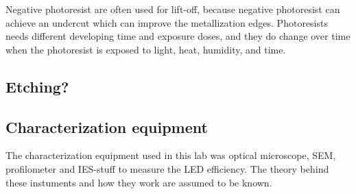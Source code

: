 Negative photoresist are often used for lift-off, because negative photoresist can achieve an undercut which can improve the metallization edges.
Photoresists needs different developing time and exposure doses, and they do change over time when the photoresist is exposed to light, heat, humidity, and time.



\subsection{Etching?}
\label{etching}


\subsection{Characterization equipment}
\label{characterization}

The characterization equipment used in this lab was optical microscope, SEM, profilometer and IES-stuff to measure the LED efficiency.
The theory behind these instuments and how they work are assumed to be known.